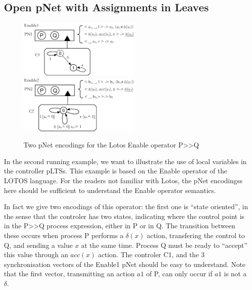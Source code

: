 \documentclass{lncs/llncs}
\begin{document}
\subsection{Open pNet with Assignments in Leaves}
\begin{figure}[h]

  \includegraphics[width=6cm]{XFIG/Enable1.eps}
  \includegraphics[width=6cm]{XFIG/Enable2.eps}
  \caption{Two pNet encodings for the Lotos Enable operator P>>Q }  \label{schema:enable-pnets}

\end{figure}

In the second running example, we want to illustrate the use of local
variables in the controller pLTSs. This example is based on the Enable
operator of the LOTOS language. For the readers not familiar with
Lotos, the pNet encodingss here should be sufficient to understand the
Enable operator semantics.

In fact we give two encodings of this operator: the first one is
``state oriented'', in the sense that the controler has two states,
indicating where the control point is in the P>>Q process expression,
either in P or in Q. The transition between these occurs when process
P performs a $\delta(x)$ action, transfering the control to Q, and
sending a value $x$ at the same time. Process Q must be ready to
``accept'' this value through an $acc(x)$ action. The controler C1,
and the 3 synchronisation vectors of the Enable1 pNet should be easy
to understand. Note 
that the first vector, transmitting an action $a1$ of P, can only
occur if $a1$ is not a $\delta$.
\end{document}
